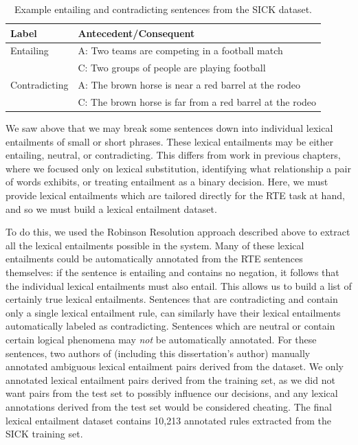\begin{table}
  \centering
  \begin{tabular}{|ll|}
    \hline
    {\bf Label} & {\bf Antecedent/Consequent}\\
    \hline
    Entailing & A: Two teams are competing in a football match\\
    & C: Two groups of people are playing football\\
    \hline
    Contradicting & A: The brown horse is near a red barrel at the rodeo\\
    & C: The brown horse is far from a red barrel at the rodeo\\
    \hline
  \end{tabular}
  \caption{Example entailing and contradicting sentences from the SICK dataset.}
  \label{tab:sickexample}
\end{table}

We saw above that we may break some sentences down into
individual lexical entailments of small or short phrases. These lexical
entailments may be either entailing, neutral, or contradicting. This differs
from work in previous chapters, where we focused only on lexical substitution,
identifying what relationship a pair of words exhibits, or treating entailment
as a binary decision. Here, we must provide lexical entailments which are
tailored directly for the RTE task at hand, and so we must build a lexical
entailment dataset.

To do this, we used the Robinson Resolution approach described above to extract
all the lexical entailments possible in the system. Many of these lexical
entailments could be automatically annotated from the RTE sentences themselves:
if the sentence is entailing and contains no negation, it follows that the
individual lexical entailments must also entail. This allows us to build a list
of certainly true lexical entailments. Sentences that are contradicting and
contain only a single lexical entailment rule, can similarly have their lexical
entailments automatically labeled as contradicting. Sentences which are neutral
or contain certain logical phenomena may {\em not} be automatically annotated.
For these sentences, two authors of  (including this
dissertation's author) manually annotated ambiguous lexical entailment pairs
derived from the dataset. We only annotated lexical entailment pairs derived
from the training set, as we did not want pairs from the test set to possibly
influence our decisions, and any lexical annotations derived from the test set
would be considered cheating. The final lexical entailment dataset contains
10,213 annotated rules extracted from the SICK training set.

